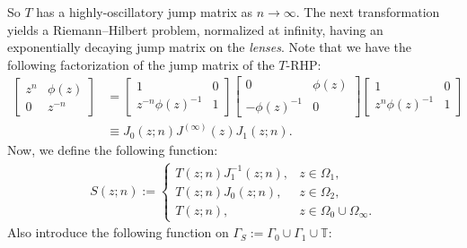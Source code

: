 \documentclass[10pt,a4paper]{amsart}
\numberwithin{equation}{section}
\newcommand{\T}{{\mathbb T}}
\newcommand{\Ga}{\Gamma}
\newcommand{\Om}{\Omega}
\begin{document}
		So $T$ has a highly-oscillatory jump matrix as $n \to \infty$. The next transformation yields a Riemann--Hilbert problem, normalized at infinity, having an exponentially decaying jump matrix on the \textit{lenses}. Note that we have the following factorization of the jump matrix of the $T$-RHP:
\begin{align*}%
			\begin{bmatrix}
				z^n & \phi(z) \\
				0 & z^{-n}
			\end{bmatrix} &= \begin{bmatrix}
				1 & 0 \\
				z^{-n}\phi(z)^{-1} & 1
			\end{bmatrix}\begin{bmatrix}
				0 & \phi(z) \\
				-\phi(z)^{-1} & 0
			\end{bmatrix}\begin{bmatrix}
				1 & 0 \\
				z^{n}\phi(z)^{-1} & 1
			\end{bmatrix}\\
& \equiv J_{0}(z;n)J^{(\infty)}(z)J_{1}(z;n).
		\end{align*}
		Now, we define the following function: \begin{gather*}%
			S(z;n):=\begin{cases}
				T(z;n)J^{-1}_{1}(z;n), & z \in \Om_1, \\
				T(z;n)J_{0}(z;n), & z \in \Om_2, \\
				T(z;n), & z\in \Om_0\cup \Om_{\infty}.
			\end{cases}
		\end{gather*}
		Also introduce the following function on $\Ga_S := \Ga_0 \cup \Ga_1 \cup \T$:
\end{document}
